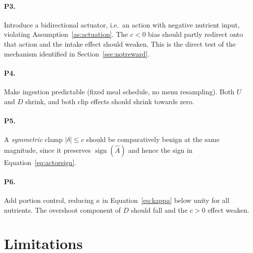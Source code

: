 \documentclass[11pt]{article}
\theoremstyle{definition}
\newcommand{\Ahat}{\hat A}
\begin{document}
\paragraph{P3.} Introduce a bidirectional actuator, i.e.\ an action with
negative nutrient input, violating Assumption~\ref{as:actuation}. The $c<0$
bias should partly redirect onto that action and the intake effect should
weaken. This is the direct test of the mechanism identified in
Section~\ref{sec:notreward}.

\paragraph{P4.} Make ingestion predictable (fixed meal schedule, no menu
resampling). Both $U$ and $D$ shrink, and both clip effects should shrink
towards zero.

\paragraph{P5.} A \emph{symmetric} clamp $|\delta|\le c$ should be comparatively
benign at the same magnitude, since it preserves $\operatorname{sign}(\Ahat)$
and hence the sign in Equation~\eqref{eq:actorsign}.

\paragraph{P6.} Add portion control, reducing $\kappa$ in
Equation~\eqref{eq:kappa} below unity for all nutrients. The overshoot
component of $D$ should fall and the $c>0$ effect weaken.

\section{Limitations}
\label{sec:limitations}
\end{document}
